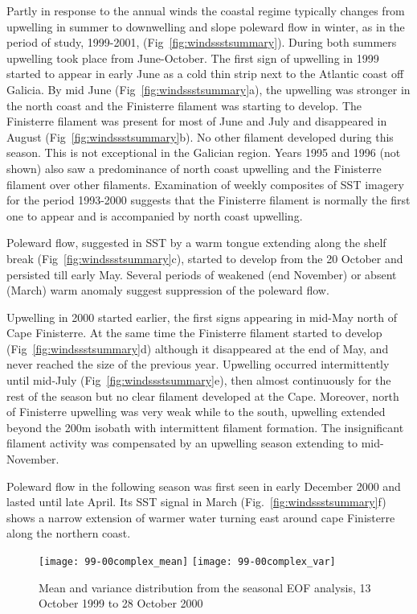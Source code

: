 Partly in response to the annual winds the coastal regime
typically changes from upwelling in summer to downwelling and
slope poleward flow in winter, as in the period of study,
1999-2001, ({Fig~\ref{fig:windssstsummary}}). During both summers
upwelling took place from June-October. The first sign of
upwelling in 1999 started to appear in early June as a cold thin
strip next to the Atlantic coast off Galicia. By mid June
(Fig~\ref{fig:windssstsummary}a), the upwelling was stronger in
the north coast and the Finisterre filament was starting to
develop. The Finisterre filament was present for most of June and
July and disappeared in August (Fig~\ref{fig:windssstsummary}b).
No other filament developed during this season. This is not
exceptional in the Galician region. Years 1995 and 1996 (not
shown) also saw a predominance of north coast upwelling and the
Finisterre filament over other filaments. Examination of weekly
composites of SST imagery for the period 1993-2000 suggests that
the Finisterre filament is normally the first one to appear and is
accompanied by north coast upwelling.

Poleward flow, suggested in SST by a warm tongue extending along
the shelf break (Fig~\ref{fig:windssstsummary}c), started to
develop from the 20 October and persisted till early May.  Several
periods of weakened (end November) or absent (March) warm anomaly
suggest suppression of the poleward flow.

Upwelling in 2000 started earlier, the first signs appearing in
mid-May north of Cape Finisterre. At the same time the Finisterre
filament started to develop (Fig~\ref{fig:windssstsummary}d)
although it disappeared at the end of May, and never reached the
size of the previous year. Upwelling occurred intermittently until
mid-July (Fig~\ref{fig:windssstsummary}e), then almost
continuously for the rest of the season but no clear filament
developed at the Cape. Moreover, north of Finisterre upwelling was
very weak while to the south, upwelling extended beyond the 200m
isobath with intermittent filament formation. The insignificant
filament activity was compensated by an upwelling season extending
to mid-November.

Poleward flow in the following season was first seen in early
December 2000 and lasted until late April. Its SST signal in March
(Fig.~\ref{fig:windssstsummary}f) shows a narrow extension of
warmer water turning east around cape Finisterre along the
northern coast.

\begin{figure}
\centering \noindent
\texttt{[image: 99-00complex\_mean]}\quad
\texttt{[image: 99-00complex\_var]}
\caption{Mean and variance distribution from the seasonal EOF
analysis, 13  October 1999 to 28 October 2000
}\label{fig:windsmeanvar}
\end{figure}

